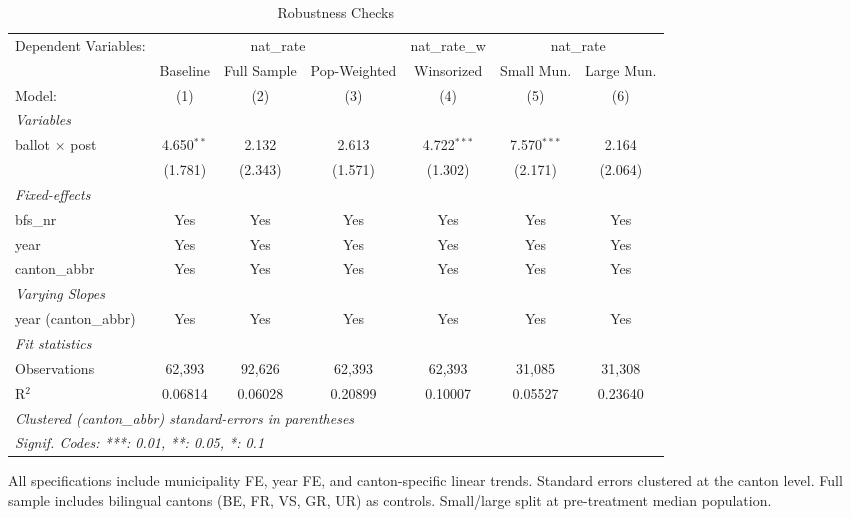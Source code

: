 
\begin{table}[htbp]
   \caption{\label{tab:robust} Robustness Checks}
   \centering
   \begin{adjustbox}{max width=\textwidth}
   \begin{tabular}{lcccccc}
      \tabularnewline \midrule \midrule
      Dependent Variables: & \multicolumn{3}{c}{nat\_rate} & nat\_rate\_w & \multicolumn{2}{c}{nat\_rate}\\
                            & Baseline     & Full Sample & Pop-Weighted & Winsorized    & Small Mun.    & Large Mun. \\   
      Model:                & (1)          & (2)         & (3)          & (4)           & (5)           & (6)\\  
      \midrule
      \emph{Variables}\\
      ballot $\times$ post  & 4.650$^{**}$ & 2.132       & 2.613        & 4.722$^{***}$ & 7.570$^{***}$ & 2.164\\   
                            & (1.781)      & (2.343)     & (1.571)      & (1.302)       & (2.171)       & (2.064)\\   
      \midrule
      \emph{Fixed-effects}\\
      bfs\_nr               & Yes          & Yes         & Yes          & Yes           & Yes           & Yes\\  
      year                  & Yes          & Yes         & Yes          & Yes           & Yes           & Yes\\  
      canton\_abbr          & Yes          & Yes         & Yes          & Yes           & Yes           & Yes\\  
      \midrule
      \emph{Varying Slopes}\\
      year (canton\_abbr)   & Yes          & Yes         & Yes          & Yes           & Yes           & Yes\\  
      \midrule
      \emph{Fit statistics}\\
      Observations          & 62,393       & 92,626      & 62,393       & 62,393        & 31,085        & 31,308\\  
      R$^2$                 & 0.06814      & 0.06028     & 0.20899      & 0.10007       & 0.05527       & 0.23640\\  
      \midrule \midrule
      \multicolumn{7}{l}{\emph{Clustered (canton\_abbr) standard-errors in parentheses}}\\
      \multicolumn{7}{l}{\emph{Signif. Codes: ***: 0.01, **: 0.05, *: 0.1}}\\
   \end{tabular}
   \end{adjustbox}

   \par \raggedright
   All specifications include municipality FE, year FE, and canton-specific linear trends. Standard errors clustered at the canton level. Full sample includes bilingual cantons (BE, FR, VS, GR, UR) as controls. Small/large split at pre-treatment median population.
\end{table}


